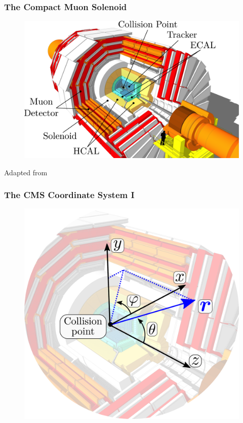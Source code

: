 \documentclass[14pt, t]{beamer}
\begin{document}
\begin{frame}
    \frametitle{The Compact Muon Solenoid}
    \begin{figure}[htb!]
        \centering
        \includegraphics[width=\linewidth]{raster/raster-svg/cms-annotated.pdf}
    \end{figure}
    \vspace{-5mm}
    \tiny{Adapted from \cite{image-cms}}
    
\end{frame}

\begin{frame}
    \frametitle{The CMS Coordinate System I}
    \vspace{-3mm}
    \begin{figure}[htb!]
        \centering
        \includegraphics[width=0.85\linewidth]{raster/raster-svg/cms-coordinate.pdf}
    \end{figure}
    
\end{frame}
\end{document}
